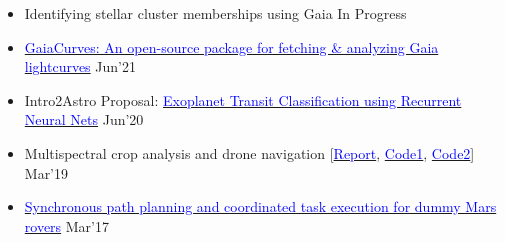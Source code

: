 \documentclass[11pt]{res} %
\begin{document}
\begin{resume}
\begin{itemize}
    \item Identifying stellar cluster memberships using Gaia \hfill In Progress
    
    \item
    \href{https://github.com/sonithls/GaiaCurves}{\textcolor{blue}{GaiaCurves: An open-source package for fetching \& analyzing Gaia lightcurves}} \hfill Jun'21
    
    \item
    Intro2Astro Proposal: \href{https://drive.google.com/file/d/1Dy6xjWMH5EVmVreHnUj9QBFsuitt-dDZ/view?usp=sharing}{\textcolor{blue}{Exoplanet Transit Classification using Recurrent Neural Nets}} \hfill Jun'20
    
    \item 
    Multispectral crop analysis and drone navigation [\href{https://drive.google.com/file/d/1_sTauKcEWi5l1tRGF1SYRc_7a13DjSDE/view}{\textcolor{blue}{Report}}, \href{https://github.com/chetanchawla/Dronalyser}{\textcolor{blue}{Code1}}, \href{https://github.com/chetanchawla/eYantra2018-HB}{\textcolor{blue}{Code2}}] \hfill Mar'19
    
    
    \item
    \href{https://github.com/chetanchawla/eYantra-2016-Bothoven}{\textcolor{blue}{Synchronous path planning and coordinated task execution for dummy Mars rovers}} \hfill Mar'17
\end{itemize}
\vspace{0.1in}
\hline



\end{resume}
\end{document}
